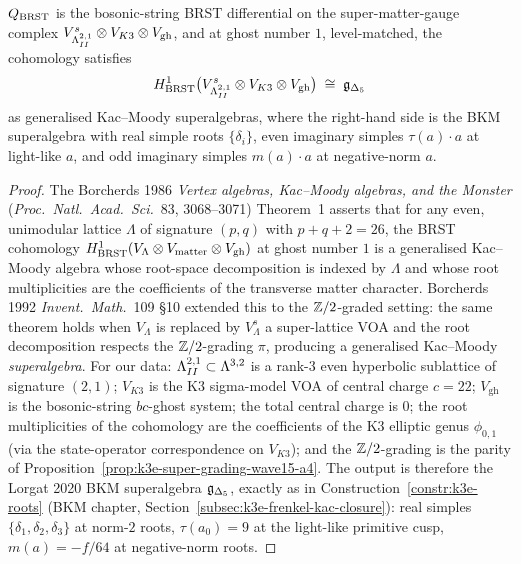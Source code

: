 \begin{theorem}
\label{thm:wave15-a4-BRST-cohomology}
\ClaimStatusProvedHere
$Q_{\mathrm{BRST}}$ is the bosonic-string BRST differential on the
super-matter-gauge complex $V^s_{\Lambda^{2,1}_{II}} \otimes V_{K3} \otimes
V_{\mathrm{gh}}$, and at ghost number $1$, level-matched, the
cohomology satisfies
\[
  H^1_{\mathrm{BRST}}\bigl(V^s_{\Lambda^{2,1}_{II}} \otimes V_{K3} \otimes
  V_{\mathrm{gh}}\bigr)
  \;\cong\;
  \mathfrak{g}_{\Delta_5}
\]
as generalised Kac--Moody superalgebras, where the right-hand side
is the BKM superalgebra with real simple roots $\{\delta_i\}$, even
imaginary simples $\tau(a) \cdot a$ at light-like $a$, and odd
imaginary simples $m(a) \cdot a$ at negative-norm $a$.
\end{theorem}

\begin{proof}
The Borcherds 1986 \emph{Vertex algebras, Kac--Moody algebras, and
the Monster} (\emph{Proc.\ Natl.\ Acad.\ Sci.}~83, 3068--3071)
Theorem~1 asserts that for any even, unimodular lattice $\Lambda$ of
signature $(p, q)$ with $p + q + 2 = 26$, the BRST cohomology
$H^1_{\mathrm{BRST}}(V_\Lambda \otimes V_{\mathrm{matter}} \otimes
V_{\mathrm{gh}})$ at ghost number $1$ is a generalised Kac--Moody
algebra whose root-space decomposition is indexed by $\Lambda$ and
whose root multiplicities are the coefficients of the transverse
matter character. Borcherds 1992 \emph{Invent.\ Math.}~109 \S10
extended this to the $\mathbb{Z}/2$-graded setting: the same theorem holds
when $V_{\Lambda}$ is replaced by $V^s_\Lambda$ a super-lattice VOA and
the root decomposition respects the $\mathbb{Z}/2$-grading $\pi$,
producing a generalised Kac--Moody \emph{superalgebra}. For our
data: $\Lambda^{2,1}_{II} \subset \Lambda^{3,2}$ is a rank-$3$ even hyperbolic
sublattice of signature $(2, 1)$; $V_{K3}$ is the K3 sigma-model VOA
of central charge $c = 22$; $V_{\mathrm{gh}}$ is the bosonic-string
$bc$-ghost system; the total central charge is $0$; the root
multiplicities of the cohomology are the coefficients of the K3
elliptic genus $\phi_{0,1}$ (via the state-operator correspondence on
$V_{K3}$); and the $\mathbb{Z}/2$-grading is the parity of
Proposition~\ref{prop:k3e-super-grading-wave15-a4}. The output is
therefore the Lorgat 2020 BKM superalgebra $\mathfrak{g}_{\Delta_5}$, exactly
as in Construction~\ref{constr:k3e-roots} (BKM
chapter, Section~\ref{subsec:k3e-frenkel-kac-closure}): real simples
$\{\delta_1, \delta_2, \delta_3\}$ at norm-$2$ roots,
$\tau(a_0) = 9$ at the light-like primitive cusp, $m(a) = -f/64$
at negative-norm roots.
\end{proof}

